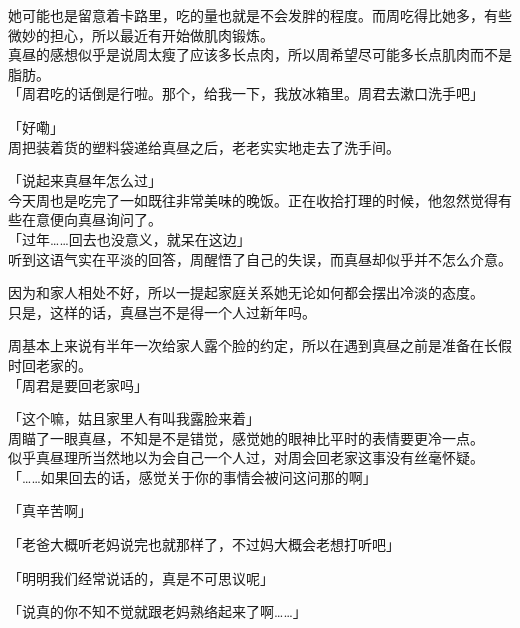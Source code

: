 她可能也是留意着卡路里，吃的量也就是不会发胖的程度。而周吃得比她多，有些微妙的担心，所以最近有开始做肌肉锻炼。\\

真昼的感想似乎是说周太瘦了应该多长点肉，所以周希望尽可能多长点肌肉而不是脂肪。\\

「周君吃的话倒是行啦。那个，给我一下，我放冰箱里。周君去漱口洗手吧」

「好嘞」\\

周把装着货的塑料袋递给真昼之后，老老实实地走去了洗手间。\\

\vspace{2\baselineskip}

「说起来真昼年怎么过」\\

今天周也是吃完了一如既往非常美味的晚饭。正在收拾打理的时候，他忽然觉得有些在意便向真昼询问了。\\

「过年……回去也没意义，就呆在这边」\\

听到这语气实在平淡的回答，周醒悟了自己的失误，而真昼却似乎并不怎么介意。

因为和家人相处不好，所以一提起家庭关系她无论如何都会摆出冷淡的态度。\\

只是，这样的话，真昼岂不是得一个人过新年吗。

周基本上来说有半年一次给家人露个脸的约定，所以在遇到真昼之前是准备在长假时回老家的。\\

「周君是要回老家吗」

「这个嘛，姑且家里人有叫我露脸来着」\\

周瞄了一眼真昼，不知是不是错觉，感觉她的眼神比平时的表情要更冷一点。\\

似乎真昼理所当然地以为会自己一个人过，对周会回老家这事没有丝毫怀疑。\\

「……如果回去的话，感觉关于你的事情会被问这问那的啊」

「真辛苦啊」

「老爸大概听老妈说完也就那样了，不过妈大概会老想打听吧」%

「明明我们经常说话的，真是不可思议呢」

「说真的你不知不觉就跟老妈熟络起来了啊……」\\

